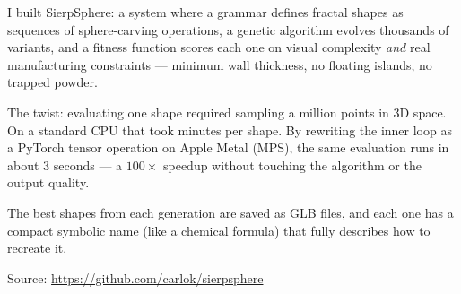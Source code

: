 \documentclass[11pt, a4paper]{article}
\begin{document}
I built SierpSphere: a system where a grammar defines fractal shapes as
sequences of sphere-carving operations, a genetic algorithm evolves thousands
of variants, and a fitness function scores each one on visual complexity
\emph{and} real manufacturing constraints — minimum wall thickness, no
floating islands, no trapped powder.

The twist: evaluating one shape required sampling a million points in 3D space.
On a standard CPU that took minutes per shape. By rewriting the inner loop as
a PyTorch tensor operation on Apple Metal (MPS), the same evaluation runs in
about 3 seconds — a $100\times$ speedup without touching the algorithm or the
output quality.

The best shapes from each generation are saved as GLB files, and each one has
a compact symbolic name (like a chemical formula) that fully describes how to
recreate it.

\medskip
\noindent Source: \url{https://github.com/carlok/sierpsphere}

\newpage

\end{document}
